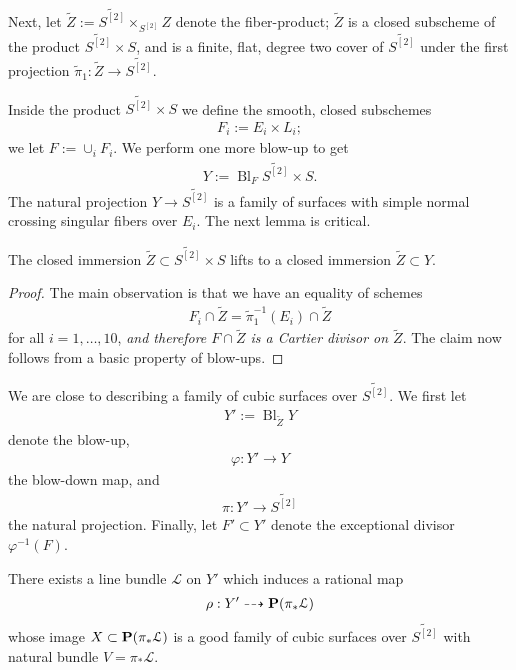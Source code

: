 \documentclass[12pt,reqno]{amsart}
\DeclareMathOperator{\Bl}{Bl}
\renewcommand{\to}{{\longrightarrow}}
\numberwithin{equation}{section}
\begin{document}
Next, let $\widetilde{Z} := \widetilde{S^{[2]}} \times_{S^{[2]}} Z$
denote the fiber-product; $\widetilde{Z}$ is a closed subscheme of the
product $\widetilde{S^{[2]}} \times S$, and is a finite, flat, degree
two cover of $\widetilde{S^{[2]}}$ under the first projection
$\tilde{\pi}_{1} : \widetilde{Z} \to \widetilde{S^{[2]}}.$

Inside the product $\widetilde{S^{[2]}} \times S$ we define the
smooth, closed subschemes
\begin{align}
  \label{eq:Fi}
  F_{i} := E_{i} \times L_{i};
\end{align}
we let $F := \cup_{i}F_{i}$.  We perform one more blow-up to get 
\begin{align}
  \label{eq:Xtilde}
  Y := \Bl_{F}\widetilde{S^{[2]}} \times S.
\end{align}
The natural projection $ Y \to \widetilde{S^{[2]}}$ is a family of
surfaces with simple normal crossing singular fibers over $E_{i}$.
The next lemma is critical.

\begin{lemma}
  The closed immersion
  $\widetilde{Z} \subset \widetilde{S^{[2]}} \times S$ lifts to a
  closed immersion $\widetilde{Z} \subset Y$.
\end{lemma}

\begin{proof}
  The main observation is that we have an equality of schemes
  \begin{align}
    \label{eq:Cartier}
    F_i \cap \widetilde{Z} = \widetilde{\pi}_{1}^{-1}(E_i) \cap \widetilde{Z}
  \end{align}
  for all $i=1, \dots, 10$, {\sl and therefore $F \cap \widetilde{Z}$
    is a Cartier divisor on $\widetilde{Z}$}. The claim now follows
  from a basic property of blow-ups.
\end{proof}



We are close to describing a family of cubic surfaces over
$\widetilde{S^{[2]}}$.  We first let
\begin{align}
  \label{eq:XB3}
  Y' := \Bl_{\widetilde{Z}}Y
\end{align}
denote the blow-up,
\begin{align}
  \label{eq:phiB3}
  \varphi: Y' \to Y
\end{align}
the blow-down map, and
\begin{align}
  \label{eq:piB3}
  \pi: Y' \to \widetilde{S^{[2]}}
\end{align}
the natural projection. Finally, let $F' \subset Y'$ denote the
exceptional divisor $\varphi^{-1}(F)$.
\begin{proposition}
  \label{proposition:resolv-b3}
  There exists a line bundle $\mathcal{L}$ on $Y'$ which induces a
  rational map
  \begin{align*}
    \rho: Y' \dashrightarrow \P(\pi_{*}\mathcal{L})
  \end{align*}
  whose image $X \subset \P(\pi_{*}\mathcal{L})$ is a good family of
  cubic surfaces over $\widetilde{S^{[2]}}$ with natural bundle
  $V = \pi_{*} \mathcal{L}$.
\end{proposition}
\end{document}
